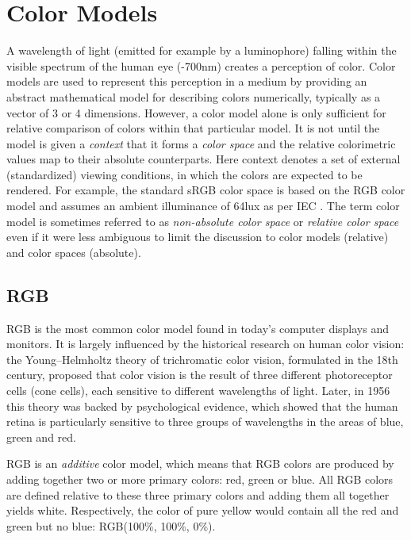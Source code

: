 \documentclass[thesis.tex]{subfiles}
\begin{document}
\section{Color Models}
\label{section:rgbhsv}

A wavelength of light (emitted for example by a luminophore) falling within the visible spectrum of the human eye (-700nm) creates a perception of color. Color models are used to represent this perception in a medium by providing an abstract mathematical model for describing colors numerically, typically as a vector of 3 or 4 dimensions. However, a color model alone is only sufficient for relative comparison of colors within that particular model. It is not until the model is given a \textit{context} that it forms a \textit{color space} and the relative colorimetric values map to their absolute counterparts. Here context denotes a set of external (standardized) viewing conditions, in which the colors are expected to be rendered. For example, the standard sRGB color space is based on the RGB color model and assumes an ambient illuminance of 64lux as per IEC \cite{iec}. The term color model is sometimes referred to as \textit{non-absolute color space} or \textit{relative color space} even if it were less ambiguous to limit the discussion to color models (relative) and color spaces (absolute).

\subsection{RGB}
RGB is the most common color model found in today's computer displays and monitors. It is largely influenced by the historical research on human color vision: the Young–Helmholtz theory of trichromatic color vision, formulated in the 18th century, proposed that color vision is the result of three different photoreceptor cells (cone cells), each sensitive to different wavelengths of light. Later, in 1956 this theory was backed by psychological evidence, which showed that the human retina is particularly sensitive to three groups of wavelengths in the areas of blue, green and red. \cite{svaetichin}

RGB is an \textit{additive} color model, which means that RGB colors are produced by adding together two or more primary colors: red, green or blue. All RGB colors are defined relative to these three primary colors and adding them all together yields white. Respectively, the color of pure yellow would contain all the red and green but no blue: RGB(100\%, 100\%, 0\%).
\end{document}
